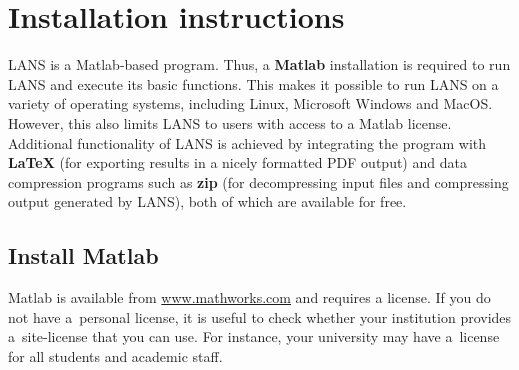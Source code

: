 \section{Installation instructions}

LANS is a Matlab-based program. Thus, a \textbf{Matlab} installation is required to run LANS and execute its basic functions. This makes it possible to run LANS on a variety of operating systems, including Linux, Microsoft Windows and MacOS. However, this also limits LANS to users with access to a Matlab license. Additional functionality of LANS is achieved by integrating the program with \textbf{\LaTeX} (for exporting results in a nicely formatted PDF output) and data compression programs such as \textbf{zip} (for decompressing input files and compressing output generated by LANS), both of which are available for free.


\subsection{Install Matlab}
\setcounter{step}{0}

\goldbox{}
Matlab is available from \url{www.mathworks.com} and requires a license. If you do not have a~personal license, it is useful to check whether your institution provides a~site-license that you can use. For instance, your university may have a~license for all students and academic staff. 
\tcbe




